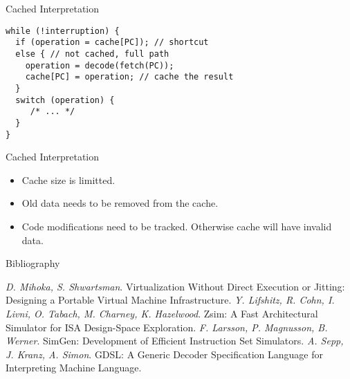 \begin{frame}[fragile]{Cached Interpretation}
\begin{lstlisting}
while (!interruption) {
  if (operation = cache[PC]); // shortcut
  else { // not cached, full path
    operation = decode(fetch(PC));
    cache[PC] = operation; // cache the result
  }
  switch (operation) {
     /* ... */
  }
}
\end{lstlisting}
\end{frame}


\begin{frame}{Cached Interpretation}
\begin{itemize}
\item Cache size is limitted.
\item Old data needs to be removed from the cache.
\item Code modifications need to be tracked. Otherwise cache will have invalid
  data.
\end{itemize}
\end{frame}

\begin{frame}[allowframebreaks]{Bibliography}
\begin{thebibliography}{99}
  \bibitem{} \textit{D. Mihoka, S. Shwartsman}. Virtualization Without Direct
    Execution or Jitting: Designing a Portable Virtual Machine Infrastructure.
  \bibitem{} \textit{Y. Lifshitz, R. Cohn, I. Livni, O. Tabach, M. Charney, K.
    Hazelwood}. Zsim: A Fast Architectural Simulator for ISA Design-Space
    Exploration.
  \bibitem{} \textit{F. Larsson, P. Magnusson, B. Werner}. SimGen: Development of
    Efficient Instruction Set Simulators.
  \bibitem{} \textit{A. Sepp, J. Kranz, A. Simon}. GDSL: A Generic Decoder
    Specification Language for Interpreting Machine Language.
\end{thebibliography}
\end{frame}

\finalslide


